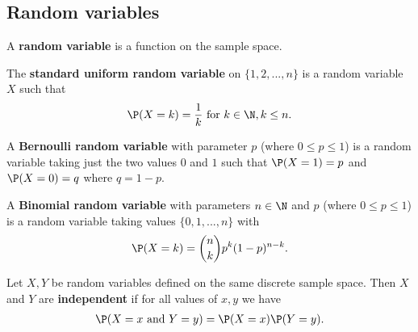 \documentclass{article}
\begin{document}
\subsection{Random variables}
\begin{definition}
	A \textbf{random variable} is a function on the sample space.
\end{definition}
\begin{definition}
	The \textbf{standard uniform random variable} on $\{1,2,...,n\}$ is a random variable $X$ such that
	\begin{align*}
		\P(X=k)=\frac{1}{k}\text{ for }k\in\N, k\leq n.
	\end{align*}
\end{definition}
\begin{definition}
	A \textbf{Bernoulli random variable} with parameter $p$ (where $0\leq p\leq 1$) is a random variable
	taking just the two values $0$ and $1$ such that $\P(X=1)=p$ and $\P(X=0)=q$ where $q=1-p$.
\end{definition}
\begin{definition}
	A \textbf{Binomial random variable} with parameters $n\in\N$ and $p$ (where $0\leq p\leq 1$) is a
	random variable taking values $\{0,1,...,n\}$ with
	\begin{align*}
		\P(X=k)=\binom{n}{k}p^k(1-p)^{n-k}.
	\end{align*}
\end{definition}
\begin{definition}
	Let $X,Y$ be random variables defined on the same discrete sample space.
	Then $X$ and $Y$ are \textbf{independent} if for all values of $x,y$ we have
	\begin{align*}
		\P(X=x \text{ and } Y=y) = \P(X=x)\P(Y = y).
	\end{align*}
\end{definition}
\end{document}

